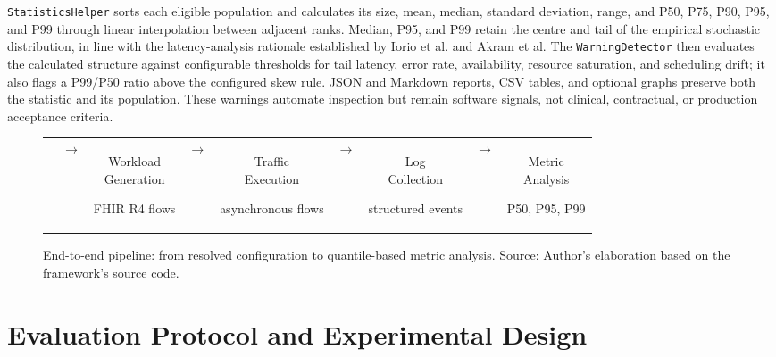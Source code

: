 \noindent \texttt{StatisticsHelper} sorts each eligible population and calculates its
size, mean, median, standard deviation, range, and P50, P75, P90, P95, and P99
through linear interpolation between adjacent ranks. Median, P95, and P99 retain
the centre and tail of the empirical stochastic distribution, in line with the
latency-analysis rationale established by Iorio et al. and Akram et
al. The \texttt{WarningDetector} then evaluates the calculated structure against
configurable thresholds for tail latency, error rate, availability, resource
saturation, and scheduling drift; it also flags a P99/P50 ratio above the
configured skew rule. JSON and Markdown reports, CSV tables,
and optional graphs preserve both the statistic and its population. These
warnings automate inspection but remain software signals, not clinical,
contractual, or production acceptance criteria.

\begin{figure}[H]
    \centering
    \small
    \setlength{\tabcolsep}{2pt}
    \begin{tabular}{@{}c c c c c c c c c@{}}
        \fbox{\parbox[c][1.9cm][c]{1.9cm}{\centering\scriptsize Configuration\par\tiny resolved parameters}}
        & $\rightarrow$ &
        \fbox{\parbox[c][1.9cm][c]{1.9cm}{\centering\scriptsize Workload\\Generation\par\tiny FHIR R4 flows}}
        & $\rightarrow$ &
        \fbox{\parbox[c][1.9cm][c]{1.9cm}{\centering\scriptsize Traffic\\Execution\par\tiny asynchronous flows}}
        & $\rightarrow$ &
        \fbox{\parbox[c][1.9cm][c]{1.9cm}{\centering\scriptsize Log\\Collection\par\tiny structured events}}
        & $\rightarrow$ &
        \fbox{\parbox[c][1.9cm][c]{1.9cm}{\centering\scriptsize Metric\\Analysis\par\tiny P50, P95, P99}}
    \end{tabular}
    \caption[End-to-end pipeline]{End-to-end pipeline: from resolved configuration to quantile-based metric analysis. Source: Author's elaboration based on the framework's source code.}
    \label{fig:rdg-end-to-end-pipeline}
\end{figure}

\section{Evaluation Protocol and Experimental Design}
\label{sec:rdg-evaluation-methodology}

